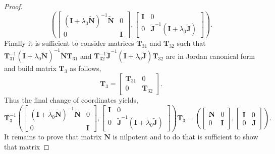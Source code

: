 \begin{proof}
			\begin{equation}
				\left(
					\begin{bmatrix}
						(\bm{I} + \lambda_{0}\tilde{\bm{N}})^{-1}\tilde{\bm{N}} 	& 0 \\
						0 			& \bm{I}
					\end{bmatrix},
					\begin{bmatrix}
						\bm{I} & 0 \\
						0 & \tilde{\bm{J}}^{-1}(\bm{I}+\lambda_{0}\tilde{\bm{J}}) 
					\end{bmatrix}
				\right).
			\end{equation}
			Finally it is sufficient to consider matrices 
			$\bm{T}_{31}$ and $\bm{T}_{32}$ such that 
			$\bm{T}_{31}^{-1}(\bm{I}+\lambda_{0}\tilde{\bm{N}})^{-1}\tilde{\bm{N}}\bm{T}_{31}$
			and $\bm{T}_{32}^{-1}\tilde{\bm{J}}^{-1}(\bm{I}+\lambda_{0}\tilde{\bm{J}})\bm{T}_{32}$
			are in Jordan canonical form and build matrix $\bm{T}_{3}$ as follows, 
			\begin{equation}
				\bm{T}_{3} = 
				\begin{bmatrix}
					\bm{T}_{31} & 0 \\
					0 & \bm{T}_{32}
				\end{bmatrix}.
			\end{equation}
			Thus the final change of coordinates yields,
			\begin{equation}
				\bm{T}_{3}^{-1}\left(
					\begin{bmatrix}
						(\bm{I} + \lambda_{0}\tilde{\bm{N}})^{-1}\tilde{\bm{N}} 	& 0 \\
						0 			& \bm{I}
					\end{bmatrix},
					\begin{bmatrix}
						\bm{I} & 0 \\
						0 & \tilde{\bm{J}}^{-1}(\bm{I}+\lambda_{0}\tilde{\bm{J}}) 
					\end{bmatrix}
				\right)\bm{T}_{3} = 
				\left(
					\begin{bmatrix}
						\bm{N} 	& 0 \\
						0 	& \bm{I}
					\end{bmatrix},
					\begin{bmatrix}
						\bm{I} & 0 \\
						0 & \bm{J} 
					\end{bmatrix}
				\right).
			\end{equation}
			It remains to prove that matrix $\bm{N}$ is nilpotent and to do that 
			is sufficient to show that matrix 

\end{proof}
